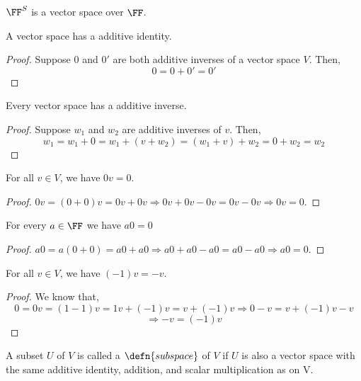 \begin{example}
    $\FF^S$ is a vector space over $\FF$.
\end{example}

\begin{theorem}
    \label{thm:unique additive identity}
    A vector space has a  additive identity.
\end{theorem}

\begin{proof}
    Suppose $0$ and $0'$ are both additive inverses of a vector space $V$. Then,
    \[ 0 = 0+0' = 0'\] 
\end{proof}

\begin{theorem}
    \label{thm:unique additive inverses}
    Every vector space has a  additive inverse.
\end{theorem}

\begin{proof}
    Suppose $w_1$ and $w_2$ are additive inverses of $v$. Then,
    \[ w_1=w_1+0 =w_1+(v+w_2)=(w_1+v)+w_2=0+w_2=w_2  \] 
\end{proof}

\begin{lemma}
    For all $v \in V$, we have $0v = 0$.
\end{lemma}

\begin{proof}
    $0v=(0+0)v=0v+0v \Rightarrow 0v+0v-0v=0v-0v \Rightarrow 0v=0$.
\end{proof}

\begin{lemma}
    For every $a \in \FF$ we have $a0=0$
\end{lemma}

\begin{proof}
    $a0=a(0+0)=a0 + a0 \Rightarrow a0+a0-a0=a0-a0 \Rightarrow a0 = 0$.
\end{proof}

\begin{lemma}
    For all $v \in V$, we have $(-1)v=-v$.
\end{lemma}

\begin{proof}
    We know that,
    \[ 0=0v=(1-1)v=1v+(-1)v=v+(-1)v \Rightarrow 0-v=v+(-1)v-v \]
    \[ \Rightarrow -v=(-1)v \]
\end{proof}

\begin{definition}[Subspace]
    A subset $U$ of $V$ is called a $\defn{subspace}$ of $V$ if $U$ is also a vector space with the same additive identity, addition, and
    scalar multiplication as on V.
\end{definition}

